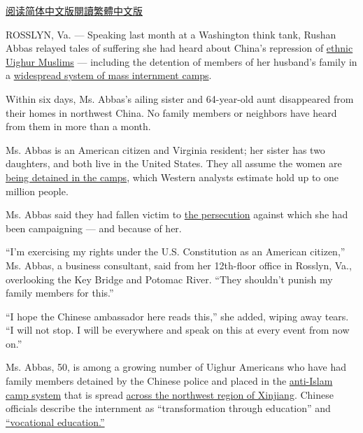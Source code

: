 \href{https://cn.nytimes.com/usa/20181019/uighur-muslims-china-detainment/}{阅读简体中文版}\href{https://cn.nytimes.com/usa/20181019/uighur-muslims-china-detainment/zh-hant/}{閱讀繁體中文版}

ROSSLYN, Va. --- Speaking last month at a Washington think tank, Rushan
Abbas relayed tales of suffering she had heard about China's repression
of
\href{https://www.nytimes.com/2009/07/12/weekinreview/12wong.html}{ethnic
Uighur Muslims} --- including the detention of members of her husband's
family in a
\href{https://jamestown.org/program/evidence-for-chinas-political-re-education-campaign-in-xinjiang/}{widespread
system of mass internment camps}.

Within six days, Ms. Abbas's ailing sister and 64-year-old aunt
disappeared from their homes in northwest China. No family members or
neighbors have heard from them in more than a month.

Ms. Abbas is an American citizen and Virginia resident; her sister has
two daughters, and both live in the United States. They all assume the
women are
\href{https://www.nytimes.com/2018/05/15/opinion/china-re-education-camps.html}{being
detained in the camps}, which Western analysts estimate hold up to one
million people.

Ms. Abbas said they had fallen victim to
\href{https://www.nytimes.com/2017/07/19/world/asia/dodging-chinese-police-in-kashgar-a-silk-road-oasis-town.html}{the
persecution} against which she had been campaigning --- and because of
her.

``I'm exercising my rights under the U.S. Constitution as an American
citizen,'' Ms. Abbas, a business consultant, said from her 12th-floor
office in Rosslyn, Va., overlooking the Key Bridge and Potomac River.
``They shouldn't punish my family members for this.''

``I hope the Chinese ambassador here reads this,'' she added, wiping
away tears. ``I will not stop. I will be everywhere and speak on this at
every event from now on.''

Ms. Abbas, 50, is among a growing number of Uighur Americans who have
had family members detained by the Chinese police and placed in the
\href{https://www.nytimes.com/2018/10/16/world/asia/china-muslim-camps-xinjiang-uighurs.html}{anti-Islam
camp system} that is spread
\href{https://supchina.com/2018/08/22/xinjiang-explainer-chinas-reeducation-camps-for-a-million-muslims}{across
the northwest region of Xinjiang}. Chinese officials describe the
internment as ``transformation through education'' and
\href{https://www.nytimes.com/2018/10/16/world/asia/china-muslim-camps-xinjiang-uighurs.html}{``vocational
education.''}

